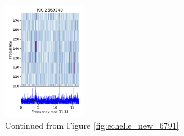 \begin{figure}
        \includegraphics[width=0.3\textwidth]{Chapter5/2569240_echelle.png}
    \caption[\'Echelle diagrams for the newly identified cluster red giants in NGC\,6791 (II)]{Continued from Figure \ref{fig:echelle_new_6791}}
    \label{fig:echelle_new2_6791}
\end{figure}

